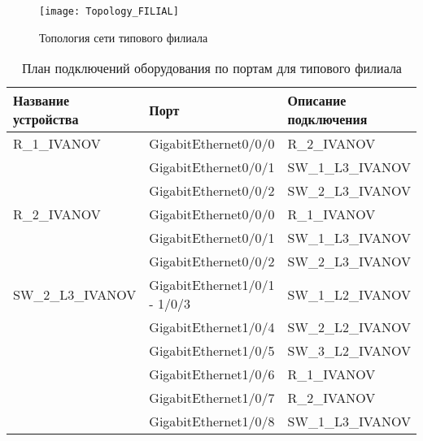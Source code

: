 \documentclass[14pt, a4paper]{extarticle}
\begin{document}
\begin{figure}[H]
  \centering
  \texttt{[image: Topology\_FILIAL]}
  \caption{Топология сети типового филиала}
  \label{fig:filial_topology}
\end{figure}


\begin{table}[H]
  \caption{План подключений оборудования по портам для типового филиала\label{tab:filial_connection_plan}}
  \centering
  \small
  \begin{tabularx}{\textwidth}{|s|s|s|}
    \hline
    Название устройства                & Порт                         & Описание подключения \\ \hline
    R\_1\_IVANOV      & GigabitEthernet0/0/0         & R\_2\_IVANOV         \\ 
                                       & GigabitEthernet0/0/1         & SW\_1\_L3\_IVANOV    \\ 
                                       & GigabitEthernet0/0/2         & SW\_2\_L3\_IVANOV    \\ \hline
    R\_2\_IVANOV      & GigabitEthernet0/0/0         & R\_1\_IVANOV         \\ 
                                       & GigabitEthernet0/0/1         & SW\_1\_L3\_IVANOV    \\ 
                                       & GigabitEthernet0/0/2         & SW\_2\_L3\_IVANOV    \\ \hline
    SW\_2\_L3\_IVANOV & GigabitEthernet1/0/1 - 1/0/3 & SW\_1\_L2\_IVANOV    \\ 
                                       & GigabitEthernet1/0/4         & SW\_2\_L2\_IVANOV    \\ 
                                       & GigabitEthernet1/0/5         & SW\_3\_L2\_IVANOV    \\ 
                                       & GigabitEthernet1/0/6         & R\_1\_IVANOV         \\ 
                                       & GigabitEthernet1/0/7         & R\_2\_IVANOV         \\ 
                                       & GigabitEthernet1/0/8         & SW\_1\_L3\_IVANOV    \\
  \end{tabularx}
\end{table}
\end{document}

